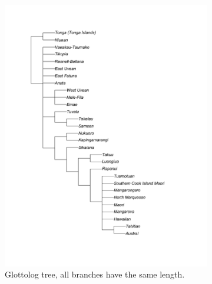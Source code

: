 \documentclass[12pt,letterpaper]{article}
\begin{document}
\begin{figure}[ht]
\centering
    \begin{subfigure}{0.3\linewidth}
      \includegraphics[width=\textwidth]{illustrations/plots_from_R/tree_plots/poly_tree_example_brlen_glottolog_1}
    \caption{Glottolog tree, all branches have the same length.}
    \label{glottolog_example_poly_1}
    \end{subfigure}
\hfil
    \begin{subfigure}{0.3\linewidth}

\end{subfigure}
\end{figure}
\end{document}
